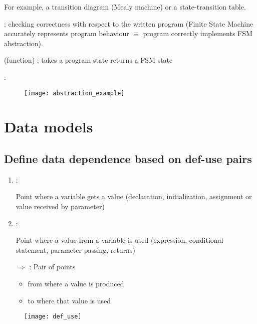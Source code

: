 For example, a transition diagram (Mealy machine) or a state-transition table.

 : checking correctness with respect to the written program (Finite State Machine accurately represents program behaviour $\equiv$ program correctly implements FSM abstraction).

 (function) : takes a program state returns a FSM state

 :
\begin{figure}[H]
    \centering
    \texttt{[image: abstraction\_example]}
\end{figure}

\chapter{Data models}

\section{Define data dependence based on def-use pairs}

\begin{minipage}[t]{0.48\textwidth}
    \begin{enumerate}
        \item {} :

        Point where a variable gets a value (declaration, initialization, assignment or value received by parameter)
    \item {} :

    Point where a value from a variable is used (expression, conditional statement, parameter passing, returns)
    \item[$\Rightarrow$]  : Pair of points
    \begin{itemize}
        \item from where a value is produced
        \item to where that value is used
    \end{itemize}
\end{enumerate}
\end{minipage}
\hfill
\begin{minipage}[t]{0.48\textwidth}
\begin{figure}[H]
    \centering
    \texttt{[image: def\_use]}
\end{figure}
\end{minipage}

